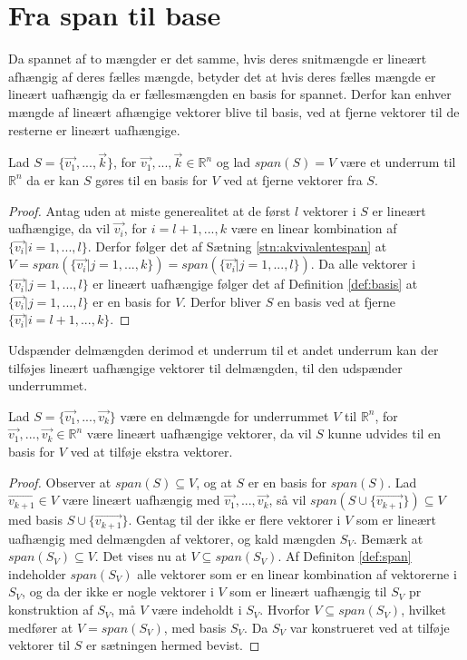 \section{Fra span til base}
Da spannet af to mængder er det samme, hvis deres snitmængde er lineært afhængig af deres fælles mængde, betyder det at hvis deres fælles mængde er lineært uafhængig da er fællesmængden en basis for spannet.
Derfor kan enhver mængde af lineært afhængige vektorer blive til basis, ved at fjerne vektorer til de resterne er lineært uafhængige.
\begin{stn}
Lad $S=\{\vec{v_1}, ..., \vec{k}\}$, for $\vec{v_1}, ..., \vec{k} \in \mathds{R}^n$ og lad $span(S) = V$ være et underrum til $\mathds{R}^n$ da er kan $S$ gøres til en basis for $V$ ved at fjerne vektorer fra $S$.
\label{stn:reduceringbasis}
\end{stn}
\begin{proof}
Antag uden at miste generealitet at de først $l$ vektorer i $S$ er  lineært uafhængige, da vil $\vec{v_i}$, for $i = l+1,...,k$ være en linear kombination af $\{\vec{v_i} | i = 1,...,l\}$. 
Derfor følger det af Sætning \ref{stn:akvivalentespan} at $V = span(\{\vec{v_i}| j =1,...,k\}) =span(\{\vec{v_i}| j=1,...,l\})$.
Da alle vektorer i $\{\vec{v_i}| j=1,...,l\}$ er lineært uafhængige følger det af Definition \ref{def:basis} at $\{\vec{v_i}| j=1,...,l\}$ er en basis for $V$. 
Derfor bliver $S$ en basis ved at fjerne $\{\vec{v_i}| i = l+1,...,k\}$.
\end{proof}
Udspænder delmængden derimod et underrum til et andet underrum kan der tilføjes lineært uafhængige vektorer til delmængden, til den udspænder underrummet.
\begin{stn}
Lad $S=\{\vec{v_1}, ..., \vec{v_k}\}$ være en delmængde for underrummet $V$ til $\mathds{R}^n$, for $\vec{v_1}, ..., \vec{v_k} \in \mathds{R}^n$ være lineært uafhængige vektorer, da vil $S$ kunne udvides til en basis for $V$ ved at tilføje ekstra vektorer.
\end{stn}
\begin{proof}
Observer at $span(S) \subseteq V$, og at $S$ er en basis for $span(S)$.
Lad $\vec{v_{k+1}} \in V$ være lineært uafhængig med $\vec{v_1}, ..., \vec{v_k}$, så vil $span(S\cup\{\vec{v_{k+1}}\}) \subseteq V$ med basis $S\cup\{\vec{v_{k+1}}\}$. 
Gentag til der ikke er flere vektorer i $V$ som er lineært uafhængig med delmængden af vektorer, og kald mængden $S_V$.
Bemærk at $span(S_V) \subseteq V$.
Det vises nu at $V \subseteq span(S_V)$. 
Af Definiton \ref{def:span} indeholder $span(S_V)$ alle vektorer som er en linear kombination af vektorerne i $S_V$, og da der ikke er nogle vektorer i $V$ som er lineært uafhængig til $S_V$ pr konstruktion af $S_V$, må $V$ være indeholdt i $S_V$. 
Hvorfor $V \subseteq span(S_V)$, hvilket medfører at $V = span(S_V)$, med basis $S_V$. 
Da $S_V$ var konstrueret ved at tilføje vektorer til $S$ er sætningen hermed bevist.
\end{proof}
